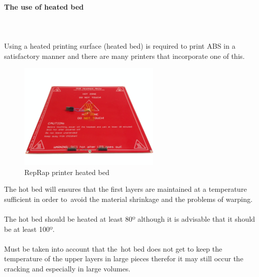 \documentclass[11pt,a4paper]{article}
\begin{document}
			\paragraph{The use of heated bed}\mbox{}\\\\
Using a heated printing surface (heated bed) is required to print ABS in a satisfactory manner and there are many printers that incorporate one of this.
\begin{figure}[H]
\centering
\includegraphics[width=0.6\textwidth,cfbox=azul_marcos 4pt 0pt]{FOTOS/HEATEDBED}
\caption*{RepRap printer heated bed}
\end{figure}
The hot bed will ensures that the first layers are maintained at a temperature sufficient in order to avoid the material shrinkage and the problems of warping.
\\\\
The hot bed should be heated at least 80º although it is advisable that it should be at least 100º.
\\\\
Must be taken into account that the hot bed does not get to keep the temperature of the upper layers in large pieces therefor it may still occur the cracking and especially in large volumes.
\end{document}
